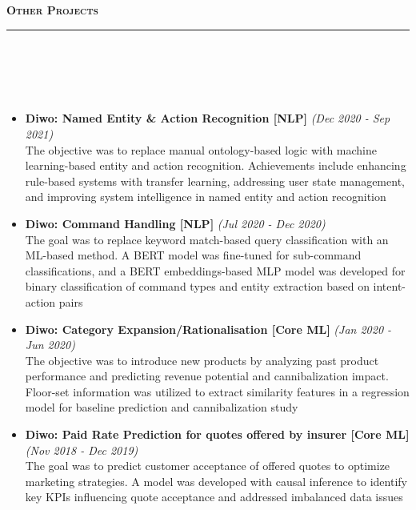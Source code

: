 \documentclass[a4paper,10pt]{article}
\newcommand{\lsep}{-0.5cm}
\newcommand{\resheading}[1]{{\small
        {
            \begin{minipage}
                {0.992\textwidth}\textbf{{\textsc{#1 \vphantom{p\^{E}} }}}
                \\[-0.3cm]
                \hrule
            \end{minipage}
            \\[-0.5cm]
        }
 }}
\begin{document}
\vspace{2pt}
\noindent
\resheading{\textbf{\large Other Projects}}\\[\lsep]
\\[-0.3cm]
\begin{itemize}

\item \textbf{Diwo: Named Entity \& Action Recognition [NLP] } \hfill {\emph{(Dec 2020 - Sep 2021)}}\\The objective was to replace manual ontology-based logic with machine learning-based entity and action recognition. Achievements include enhancing rule-based systems with transfer learning, addressing user state management, and improving system intelligence in named entity and action recognition 
\\ [-0.5cm]

\item \textbf{Diwo: Command Handling  [NLP]}  \hfill {\emph{(Jul 2020 - Dec 2020)}}\\
The goal was to replace keyword match-based query classification with an ML-based method. A BERT model was fine-tuned for sub-command classifications, and a BERT embeddings-based MLP model was developed for binary classification of command types and entity extraction based on intent-action pairs
\\ [-0.5cm]

\item \textbf{Diwo: Category Expansion/Rationalisation  [Core ML]} \hfill {\emph{(Jan 2020 - Jun 2020)}} \\
The objective was to introduce new products by analyzing past product performance and predicting revenue potential and cannibalization impact. Floor-set information was utilized to extract similarity features in a regression model for baseline prediction and cannibalization study 
\\ [-0.5cm]

\item \textbf{Diwo: Paid Rate Prediction for quotes offered by insurer  [Core ML]}\hfill {\emph{(Nov 2018 - Dec 2019)}}\\
The goal was to predict customer acceptance of offered quotes to optimize marketing strategies. A model was developed with causal inference to identify key KPIs influencing quote acceptance and addressed imbalanced data issues
\\ [-0.5cm]



\end{itemize}
\end{document}
